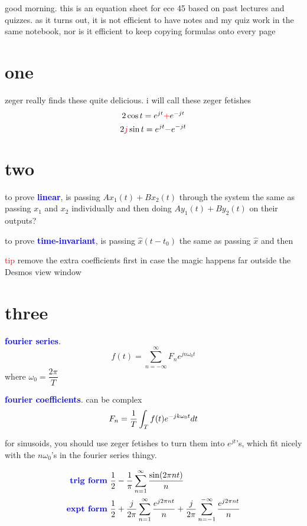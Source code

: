 \documentclass[a5paper, fleqn]{article}
\newcommand{\vocab}[1]{\textbf{\textcolor{blue}{#1}}}
\newcommand{\emf}[1]{\textcolor{red}{#1}}
\newcommand{\wrap}{\hangpara{0.5cm}{1}}
\begin{document}
good morning. this is an equation sheet for ece 45 based on past lectures and quizzes. as it turns out, it is not efficient to have notes and my quiz work in the same notebook, nor is it efficient to keep copying formulas onto every page

\section*{\textcolor{primary}{one}}

zeger really finds these quite delicious. i will call these zeger fetishes
\[2 \cos t = e^{jt} \emf{+} e^{-jt}\]
\[2\emf{j} \sin t = e^{jt} \emf{-} e^{-jt}\]

\section*{\textcolor{primary}{two}}

\wrap to prove \vocab{linear}, is passing $Ax_1(t) + Bx_2(t)$ through the system the same as passing $x_1$ and $x_2$ individually and then doing $Ay_1(t) + By_2(t)$ on their outputs?

\wrap to prove \vocab{time-invariant}, is passing $\hat{x}(t - t_0)$ the same as passing $\hat{x}$ and then

\wrap \emf{tip} remove the extra coefficients first in case the magic happens far outside the Desmos view window

\section*{\textcolor{primary}{three}}

\vocab{fourier series}.
\[f(t) = \sum_{n = -\infty}^{\infty} F_n e^{jn\omega_0 t}\]
where $\omega_0 = \dfrac{2\pi}{T}$

\vocab{fourier coefficients}. can be complex
\[F_n = \frac{1}{T} \int_T f(t) e^{\emf{-}jk\omega_0 t} dt\]

\wrap for sinusoids, you should use zeger fetishes to turn them into $e^{jt}$'s, which fit nicely with the $n\omega_0$'s in the fourier series thingy.

\begin{align*}
  \vocab{trig form} & ~ \frac{1}{2} - \frac{1}{\pi} \sum_{n = 1}^\infty \frac{\sin(2\pi nt)}{n}                                                                 \\
  \vocab{expt form} & ~ \frac{1}{2} + \frac{j}{2\pi} \sum_{n = 1}^\infty \frac{e^{j2\pi nt}}{n} + \frac{j}{2\pi} \sum_{n = -1}^{-\infty} \frac{e^{j2\pi nt}}{n}
\end{align*}
\end{document}

